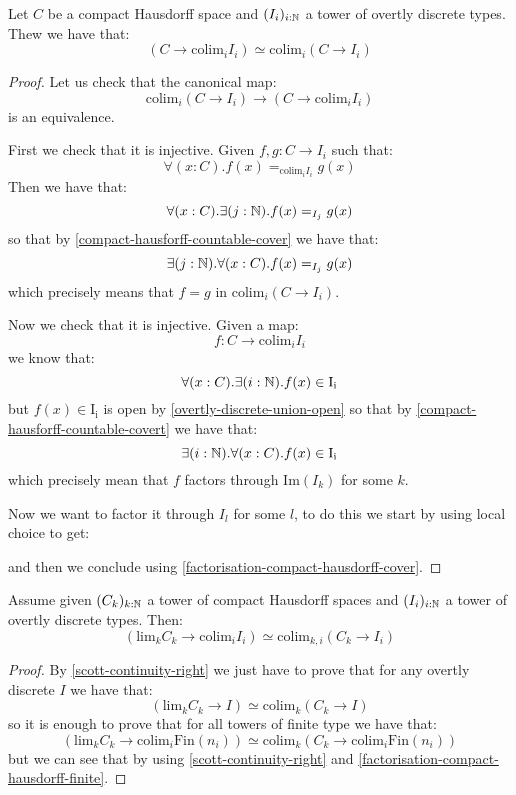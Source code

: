 \begin{lemma}\label{scott-continuity-right}
Let $C$ be a compact Hausdorff space and $(I_i)_{i:\mathbb{N}}$ a tower of overtly discrete types. Thew we have that:
\[(C\to \mathrm{colim}_i I_i) \simeq \mathrm{colim}_i (C\to I_i)\]
\end{lemma}

\begin{proof}
Let us check that the canonical map:
\[\mathrm{colim}_i (C\to I_i) \to (C\to \mathrm{colim}_i I_i) \]
is an equivalence. 

First we check that it is injective. Given $f,g:C\to I_i$ such that:
\[\forall(x:C).  f(x) =_{\mathrm{colim}_iI_i} g(x)\]
Then we have that:
\[\forall(x:C).  \exists(j:\mathbb{N}). f(x) =_{I_j} g(x)\]
so that by \cref{compact-hausforff-countable-cover} we have that:
\[\exists(j:\mathbb{N}). \forall(x:C). f(x) =_{I_j} g(x)\]
which precisely means that $f=g$ in $\mathrm{colim}_i (C\to I_i)$.

Now we check that it is injective. Given a map:
\[f:C\to \mathrm{colim}_i I_i\]
we know that:
\[\forall(x:C). \exists(i:\mathbb{N}). f(x)\in \mathrm{I_i}\]
but $f(x)\in \mathrm{I_i}$ is open by \cref{overtly-discrete-union-open} so that by \cref{compact-hausforff-countable-covert} we have that:
\[\exists(i:\mathbb{N}). \forall(x:C).  f(x)\in \mathrm{I_i}\]
which precisely mean that $f$ factors through $\mathrm{Im}(I_k)$ for some $k$.

Now we want to factor it through $I_l$ for some $l$, to do this we start by using local choice to get:
\begin{center}
\end{center}
and then we conclude using \cref{factorisation-compact-hausdorff-cover}.
\end{proof}

\begin{theorem}
Assume given $(C_k)_{k:\mathbb{N}}$ a tower of compact Hausdorff spaces and $(I_i)_{i:\mathbb{N}}$ a tower of overtly discrete types. Then:
\[\left( \mathrm{lim}_k C_k \to \mathrm{colim}_i I_i\right) \simeq \mathrm{colim}_{k,i} (C_k\to I_i)\]
\end{theorem}

\begin{proof}
By \cref{scott-continuity-right} we just have to prove that for any overtly discrete $I$ we have that:
\[(\mathrm{lim}_kC_k\to I) \simeq \mathrm{colim}_k(C_k\to I)\]
so it is enough to prove that for all towers of finite type we have that:
\[(\mathrm{lim}_kC_k\to \mathrm{colim}_i\mathrm{Fin}(n_i)) \simeq \mathrm{colim}_k(C_k\to \mathrm{colim}_i\mathrm{Fin}(n_i))\]
but we can see that by using \cref{scott-continuity-right} and \cref{factorisation-compact-hausdorff-finite}.
\end{proof}